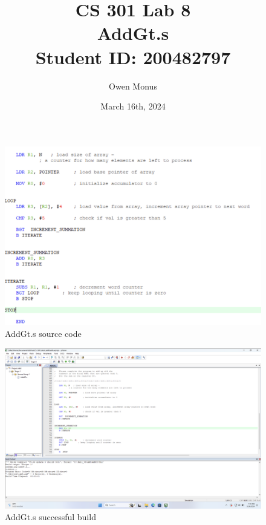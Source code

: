 \documentclass{article}
\begin{document}
\title{CS 301 Lab 8\\[0.5cm]\large AddGt.s\\[0.5cm]\large Student ID: 200482797}
\author{Owen Monus}
\date{March 16th, 2024}

\maketitle

\pagebreak

\centering
\begin{figure}
\caption{AddGt.s source code}
\includegraphics[width=\textwidth]{../Images/AddGt_sourceCode.png}
\end{figure}

\begin{figure}
\caption{AddGt.s successful build}
\includegraphics[width=\textwidth]{../Images/AddGt_Build.png}
\end{figure}
\end{document}
